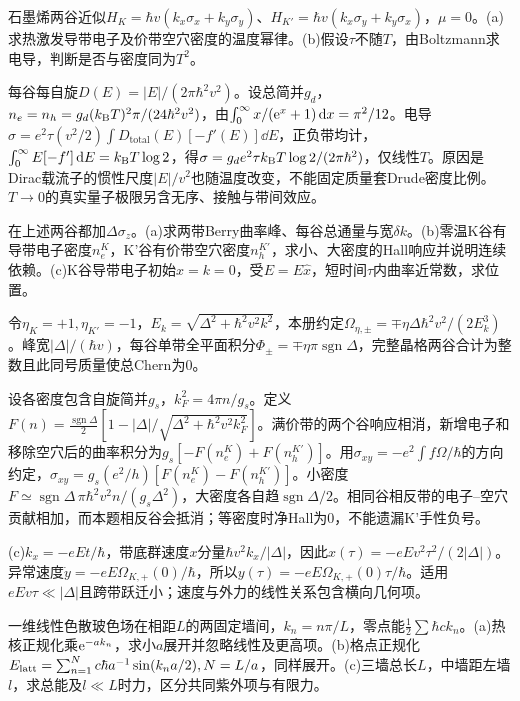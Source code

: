\begin{exercise}[原题2(a)--(b)]
石墨烯两谷近似$H_K=\hbar v(k_x\sigma_x+k_y\sigma_y)$、$H_{K'}=\hbar v(k_x\sigma_y+k_y\sigma_x)$，$\mu=0$。(a)求热激发导带电子及价带空穴密度的温度幂律。(b)假设$\tau$不随$T$，由Boltzmann求电导，判断是否与密度同为$T^2$。
\end{exercise}
\begin{solution}
每谷每自旋$D(E)=|E|/(2\pi\hbar^2v^2)$。设总简并$g_d$，$n_e=n_h=g_d(k_{\mathrm B} T)^2\pi/(24\hbar^2v^2)$，由$\int_0^\infty x/(\mathrm e^x+1)\,\mathrm d x=\pi^2/12$。电导$\sigma=e^2\tau(v^2/2)\int D_{\mathrm{total}}(E)[-f'(E)]\dd E$，正负带均计，$\int_0^\infty E[-f']\,\mathrm d E=k_{\mathrm B} T\log2$，得$\sigma=g_de^2\tau k_{\mathrm B} T\log2/(2\pi\hbar^2)$，仅线性$T$。原因是Dirac载流子的惯性尺度$|E|/v^2$也随温度改变，不能固定质量套Drude密度比例。$T\to0$的真实量子极限另含无序、接触与带间效应。
\end{solution}
\begin{exercise}[原题3(a)--(c)]
在上述两谷都加$\Delta\sigma_z$。(a)求两带Berry曲率峰、每谷总通量与宽$\delta k$。(b)零温K谷有导带电子密度$n_e^K$，K'谷有价带空穴密度$n_h^{K'}$，求小、大密度的Hall响应并说明连续依赖。(c)K谷导带电子初始$x=k=0$，受$E=E\hat x$，短时间$\tau$内曲率近常数，求位置。
\end{exercise}
\begin{solution}
令$\eta_K=+1,\eta_{K'}=-1$，$E_k=\sqrt{\Delta^2+\hbar^2v^2k^2}$，本册约定$\Omega_{\eta,\pm}=\mp\eta\Delta\hbar^2v^2/(2E_k^3)$。峰宽$|\Delta|/(\hbar v)$，每谷单带全平面积分$\Phi_\pm=\mp\eta\pi\operatorname{sgn}\Delta$，完整晶格两谷合计为整数且此同号质量使总Chern为0。

设各密度包含自旋简并$g_s$，$k_F^2=4\pi n/g_s$。定义$F(n)=\frac{\operatorname{sgn}\Delta}{2}[1-|\Delta|/\sqrt{\Delta^2+\hbar^2v^2k_F^2}]$。满价带的两个谷响应相消，新增电子和移除空穴后的曲率积分为$g_s[-F(n_e^K)+F(n_h^{K'})]$。用$\sigma_{xy}=-e^2\int f\Omega/\hbar$的方向约定，$\sigma_{xy}=g_s(e^2/h)[F(n_e^K)-F(n_h^{K'})]$。小密度$F\simeq\operatorname{sgn}\Delta\,\pi\hbar^2v^2n/(g_s\Delta^2)$，大密度各自趋$\operatorname{sgn}\Delta/2$。相同谷相反带的电子--空穴贡献相加，而本题相反谷会抵消；等密度时净Hall为0，不能遗漏K'手性负号。

(c)$k_x=-eEt/\hbar$，带底群速度$x$分量$\hbar v^2k_x/|\Delta|$，因此$x(\tau)=-eEv^2\tau^2/(2|\Delta|)$。异常速度$\dot y=-eE\Omega_{K,+}(0)/\hbar$，所以$y(\tau)=-eE\Omega_{K,+}(0)\tau/\hbar$。适用$eEv\tau\ll|\Delta|$且跨带跃迁小；速度与外力的线性关系包含横向几何项。
\end{solution}
\begin{exercise}[原题1(a)--(c)]
一维线性色散玻色场在相距$L$的两固定墙间，$k_n=n\pi/L$，零点能$\frac12\sum\hbar ck_n$。(a)热核正规化乘$\mathrm e^{-ak_n}$，求小$a$展开并忽略线性及更高项。(b)格点正规化$E_{\rm latt}=\sum_{n=1}^{N}c\hbar a^{-1}\sin(k_na/2),N=L/a$，同样展开。(c)三墙总长$L$，中墙距左墙$l$，求总能及$l\ll L$时力，区分共同紫外项与有限力。
\end{exercise}
